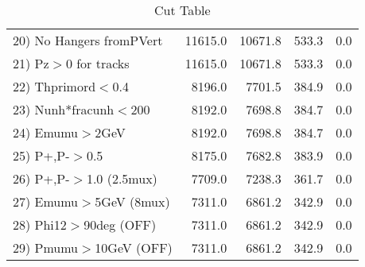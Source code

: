 \begin{table}[h!]
\begin{tabular}{||l||r|r|r|r||}
 20) No Hangers fromPVert &     11615.0 &     10671.8 &       533.3 &         0.0 \\
 21) Pz$>$0 for tracks    &     11615.0 &     10671.8 &       533.3 &         0.0 \\
 22) Thprimord$<$0.4      &      8196.0 &      7701.5 &       384.9 &         0.0 \\
 23) Nunh*fracunh$<$200   &      8192.0 &      7698.8 &       384.7 &         0.0 \\
 24) Emumu$>$2GeV         &      8192.0 &      7698.8 &       384.7 &         0.0 \\
 25) P+,P-$>$0.5          &      8175.0 &      7682.8 &       383.9 &         0.0 \\
 26) P+,P-$>$1.0 (2.5mux) &      7709.0 &      7238.3 &       361.7 &         0.0 \\
 27) Emumu$>$5GeV  (8mux) &      7311.0 &      6861.2 &       342.9 &         0.0 \\
 28) Phi12$>$90deg  (OFF) &      7311.0 &      6861.2 &       342.9 &         0.0 \\
 29) Pmumu$>$10GeV  (OFF) &      7311.0 &      6861.2 &       342.9 &         0.0 \\
 \hline
 \hline
 \end{tabular}
 \caption{Cut Table \cohrp  }
 \label{tab-cut_crhop}
 \end{table}
